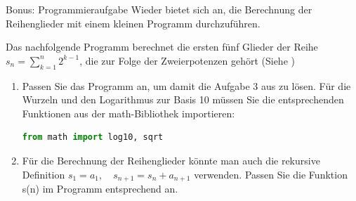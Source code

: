 \clearpage
\begin{ueb}
    {Bonus: Programmieraufgabe}{}
    Wieder bietet sich an, die Berechnung der Reihenglieder mit einem kleinen Programm durchzuführen.

    Das nachfolgende Programm berechnet die ersten fünf Glieder der Reihe $s_n = \sum\limits_{k=1}^n 2^{k-1}$, die zur Folge der Zweierpotenzen gehört (Siehe  )

    

    \begin{enumerate}
        \item Passen Sie das Programm an, um damit die Aufgabe 3 aus  zu lösen. Für die Wurzeln und den Logarithmus zur Basis 10 müssen Sie die entsprechenden Funktionen aus der math-Bibliothek importieren:
        \begin{lstlisting}[language=Python]
    from math import log10, sqrt     \end{lstlisting}
    \item Für die Berechnung der Reihenglieder könnte man auch die rekursive Definition $s_1=a_1,\quad  s_{n+1}=s_n + a_{n+1} $ verwenden. Passen Sie die Funktion s(n) im Programm entsprechend an.
        
    \end{enumerate}
    
\end{ueb}





